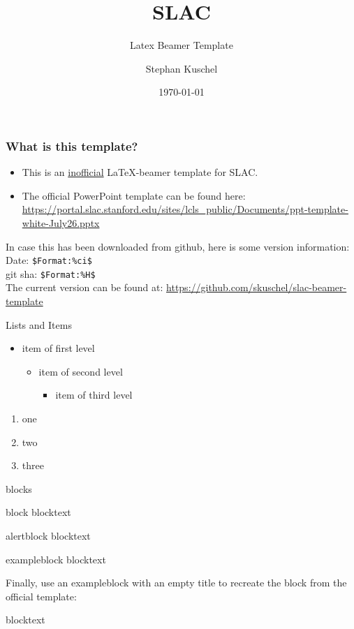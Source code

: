 \documentclass{beamer}
\title{SLAC}
\subtitle{Latex Beamer Template}
\author{Stephan Kuschel}
\institute{SLAC National Accelerator Laboratory}
\date{\today}
\begin{document}
\frame{\titlepage}


\begin{frame}[fragile]
\frametitle{What is this template?}
\begin{itemize}
\item This is an \underline{inofficial} \LaTeX-beamer template for SLAC.
\item The official PowerPoint template can be found here: \\
\url{https://portal.slac.stanford.edu/sites/lcls_public/Documents/ppt-template-white-July26.pptx}
\end{itemize}
In case this has been downloaded from github, here is some version information: \\
Date: \verb|$Format:%ci$| \\
git sha: \verb|$Format:%H$| \\[1em]
The current version can be found at:
\url{https://github.com/skuschel/slac-beamer-template}
\end{frame}


\begin{frame}{Lists and Items}
  \begin{itemize}
    \item item of first level
    \begin{itemize}
      \item item of second level
      \begin{itemize}
        \item item of third level
      \end{itemize}
    \end{itemize}
  \end{itemize}
  \begin{enumerate}
    \item one
    \item two
    \item three
  \end{enumerate}
\end{frame}

\begin{frame}{blocks}
\begin{block}{block}
  blocktext
\end{block}

\begin{alertblock}{alertblock}
  blocktext
\end{alertblock}

\begin{exampleblock}{exampleblock}
  blocktext
\end{exampleblock}

Finally, use an exampleblock with an empty title to recreate the block from the official template:
\begin{exampleblock}{}
  blocktext
\end{exampleblock}
\end{frame}
\end{document}
